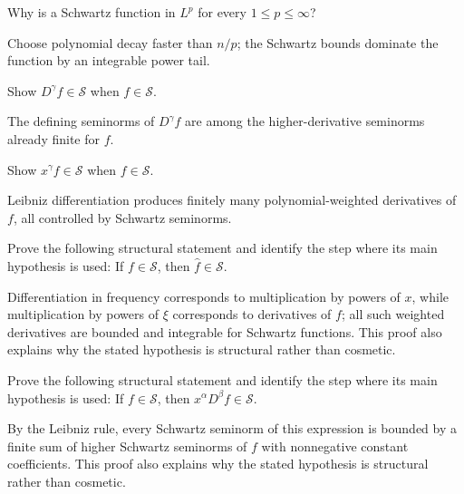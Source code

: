 \begin{problem}\label{prob:iii14-problem-06}
Why is a Schwartz function in \(L^p\) for every \(1\le p\le\infty\)?
\end{problem}
\begin{solution}
Choose polynomial decay faster than \(n/p\); the Schwartz bounds dominate
the function by an integrable power tail.
\end{solution}

\begin{problem}\label{prob:iii14-problem-07}
Show \(D^\gamma f\in\mathcal S\) when \(f\in\mathcal S\).
\end{problem}
\begin{solution}
The defining seminorms of \(D^\gamma f\) are among the higher-derivative
seminorms already finite for \(f\).
\end{solution}

\begin{problem}\label{prob:iii14-problem-08}
Show \(x^\gamma f\in\mathcal S\) when \(f\in\mathcal S\).
\end{problem}
\begin{solution}
Leibniz differentiation produces finitely many polynomial-weighted
derivatives of \(f\), all controlled by Schwartz seminorms.
\end{solution}

\begin{problem}\label{prob:iii14-problem-09}
Prove the following structural statement and identify the step where its main hypothesis is used: If $f\in\mathcal S$, then $\widehat f\in\mathcal S$.
\end{problem}
\begin{solution}
Differentiation in frequency corresponds to multiplication by powers of $x$, while multiplication by powers of $\xi$ corresponds to derivatives of $f$; all such weighted derivatives are bounded and integrable for Schwartz functions. This proof also explains why the stated hypothesis is structural rather than cosmetic.
\end{solution}

\begin{problem}\label{prob:iii14-problem-10}
Prove the following structural statement and identify the step where its main hypothesis is used: If $f\in\mathcal S$, then $x^\alpha D^\beta f\in\mathcal S$.
\end{problem}
\begin{solution}
By the Leibniz rule, every Schwartz seminorm of this expression is bounded by a finite sum of higher Schwartz seminorms of $f$ with nonnegative constant coefficients. This proof also explains why the stated hypothesis is structural rather than cosmetic.
\end{solution}

